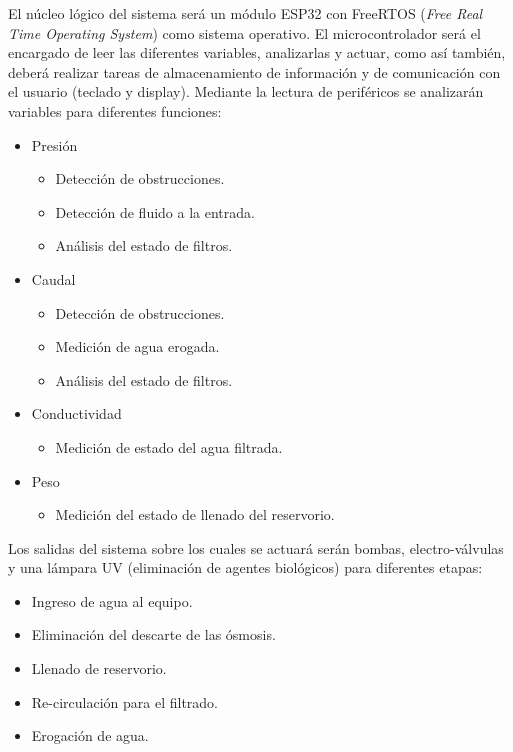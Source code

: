 \documentclass[
11pt, %
]{charter}
\begin{document}
\vspace{25px}

El núcleo lógico del sistema será un módulo ESP32 con FreeRTOS (\textit{Free Real Time Operating System}) como sistema operativo. El microcontrolador será el encargado de leer las diferentes variables, analizarlas y actuar, como así también, deberá realizar tareas de almacenamiento de información y de comunicación con el usuario (teclado y display).
Mediante la lectura de periféricos se analizarán variables para diferentes funciones:
\begin{itemize}
	\item Presión
	\begin{itemize}
		\item Detección de obstrucciones.
		\item Detección de fluido a la entrada.
		\item Análisis del estado de filtros.
	\end{itemize}
	\item Caudal	
	\begin{itemize}
		\item Detección de obstrucciones.
		\item Medición de agua erogada.
		\item Análisis del estado de filtros.
	\end{itemize}
	\item Conductividad
	\begin{itemize}
		\item Medición de estado del agua filtrada.
	\end{itemize}
	\item Peso
	\begin{itemize}
		\item Medición del estado de llenado del reservorio.
	\end{itemize}
\end{itemize}

Los salidas del sistema sobre los cuales se actuará serán bombas, electro-válvulas y una lámpara UV (eliminación de agentes biológicos) para diferentes etapas:
\begin{itemize}
	\item Ingreso de agua al equipo.
	\item Eliminación del descarte de las ósmosis.
	\item Llenado de reservorio.
	\item Re-circulación para el filtrado.
	\item Erogación de agua.
\end{itemize}
\end{document}
